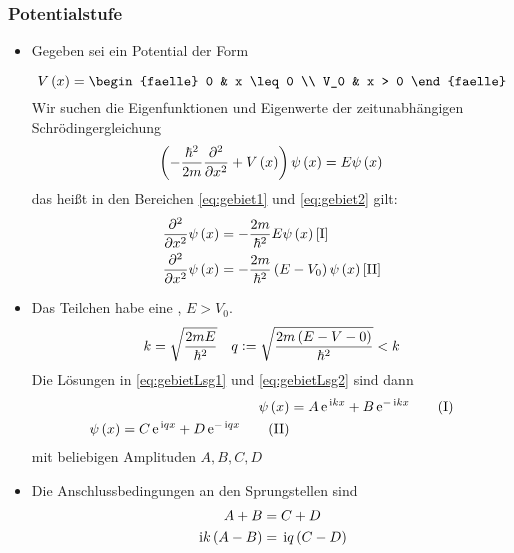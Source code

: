 \subsubsection{Potentialstufe}

\begin{itemize}
  \item Gegeben sei ein Potential der Form
  \begin{figure}[H]
    \centering
    
  \end{figure}
  \begin{equation}
    V\of{x} = \begin{faelle} 0 & x \leq 0 \\ V_0 & x > 0 \end{faelle}
  \end{equation}
  Wir suchen die Eigenfunktionen und Eigenwerte der zeitunabhängigen Schrödingergleichung
  \begin{equation}
    \left(-\frac{\hbar^2}{2m}\frac{\partial^{2} }{\partial x^{2}} + V\left(x\right)\right)\psi\left(x\right) = E\psi\left(x\right)
  \end{equation}
  das heißt in den Bereichen \eqref{eq:gebiet1} und \eqref{eq:gebiet2} gilt:
  \begin{align}
    \frac{\partial^{2} }{\partial x^{2}} \psi\left(x\right) & = - \frac{2m}{\hbar^2} E \psi\left(x\right) \label{eq:gebiet1} \ref{I} \\
    \frac{\partial^{2} }{\partial x^{2}} \psi\left(x\right) & = - \frac{2m}{\hbar^2} \left(E-V_0\right) \psi\left(x\right) \label{eq:gebiet2} \ref{II}
  \end{align}
  \item {} Das Teilchen habe eine , $E > V_0$.
  \begin{equation}
    k = \sqrt{\frac{2mE}{\hbar^2}} \quad q \vcentcolon = \sqrt{\frac{2m\left(E-V-0\right)}{\hbar^2}} < k
  \end{equation}
  Die Lösungen in \eqref{eq:gebietLsg1} und \eqref{eq:gebietLsg2} sind dann
  \begin{align}
    \psi\left(x\right) & = A\, \text{e}^{\, \text{i} k x} + B\, \text{e}^{- \, \text{i} k x} \label{eq:gebietLsg1} \tag{I} \\
    \psi\left(x\right) = C \, \text{e}^{\, \text{i} q x} + D \, \text{e}^{-\, \text{i} q x} \label{eq:gebietLsg2} \tag{II}
  \end{align}
  mit beliebigen Amplituden $A,B,C,D$
  \item Die Anschlussbedingungen an den Sprungstellen sind
  \begin{align}
    A + B & = C + D \\
    \, \text{i} k \left(A - B\right) & = \, \text{i} q \left(C - D\right)
  \end{align}

\end{itemize}

